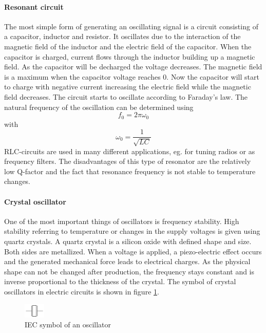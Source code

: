 \paragraph{Resonant circuit\\}
The most simple form of generating an oscillating signal is a circuit consisting of a capacitor, inductor and resistor. It oscillates due to the interaction of the magnetic field of the inductor and the electric field of the capacitor. When the capacitor is charged, current flows through the inductor building up a magnetic field. As the capacitor will be decharged the voltage decreases. The magnetic field is a maximum when the capacitor voltage reaches 0. Now the capacitor will start to charge with negative current increasing the electric field while the magnetic field decreases. The circuit starts to oscillate according to Faraday's law. The natural frequency of the oscillation can be determined using
\begin{equation}
f_0=2\pi\omega_0
\end{equation}
with
\begin{equation}
\omega_0=\frac{1}{\sqrt{LC}}
\end{equation}
RLC-circuits are used in many different applications, eg. for tuning radios or as frequency filters. The disadvantages of this type of resonator are the relatively low Q-factor and the fact that resonance frequency is not stable to temperature changes.
\paragraph{Crystal oscillator\\}
One of the most important things of oscillators is frequency stability. High stability referring to temperature or changes in the supply voltages is given using quartz crystals. A quartz crystal is a silicon oxide with defined shape and size. Both sides are metallized. When a voltage is applied, a piezo-electric effect occurs and the generated mechanical force leads to electrical charges. As the physical shape can not be changed after production, the frequency stays constant and is inverse proportional to the thickness of the crystal. The symbol of crystal oscillators in electric circuits is shown in figure \ref{fig:crystaloscillatorsymbol}.
\begin{figure}[htbp]
\begin{center}
\includegraphics[width=1cm,keepaspectratio=true]{bilder/png/crystaloscillatorsymbol}
\caption{IEC symbol of an oscillator}
\label{fig:crystaloscillatorsymbol}
\end{center}
\end{figure}
